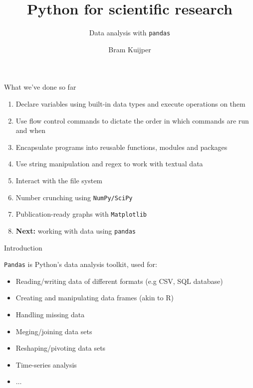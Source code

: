 \documentclass[xcolor=table]{beamer}
\title[Python for scientific research]{Python for scientific research}
\subtitle{Data analysis with \texttt{pandas}}
\author{Bram Kuijper}
\institute[]{University of Exeter, Penryn Campus, UK}
\begin{document}
\begin{frame}
\titlepage
\end{frame}

\begin{frame}{What we've done so far}

	\begin{enumerate}
		\item Declare variables using built-in data types and execute operations
		on them
		\item Use flow control commands to dictate the order in which commands are run
		and when
		\item Encapsulate programs into reusable functions, modules and packages
		\item Use string manipulation and regex to work with textual data
        \item Interact with the file system
		\item Number crunching using \texttt{NumPy/SciPy}
		\item Publication-ready graphs with \texttt{Matplotlib}
        \item \textbf{Next:} working with data using \texttt{pandas}
	\end{enumerate}

\end{frame}

\begin{frame}{Introduction}

\texttt{Pandas} is Python's data analysis toolkit, used for:

\begin{itemize}\addtolength{\itemsep}{.5\baselineskip}
	\item<2-> Reading/writing data of different formats (e.g CSV, SQL database)
	\item<3-> Creating and manipulating data frames (akin to R)
	\item<4-> Handling missing data
	\item<5-> Meging/joining data sets
	\item<6-> Reshaping/pivoting data sets
	\item<7-> Time-series analysis
	\item<8-> $\ldots$
\end{itemize}

\end{frame}
\end{document}
